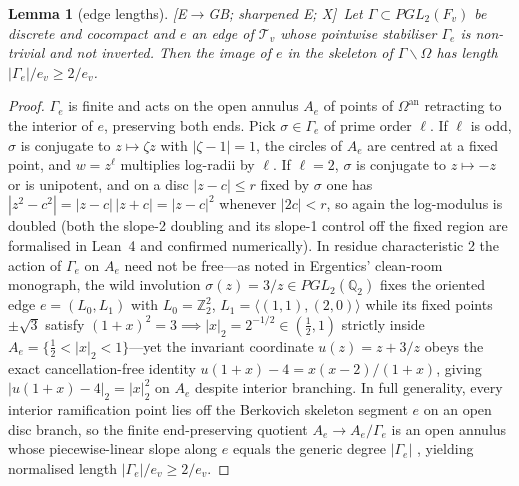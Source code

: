 \documentclass[11pt]{amsart}
\numberwithin{equation}{section}
\theoremstyle{plain}
\newtheorem{lemma}[theorem]{Lemma}
\theoremstyle{definition}\newtheorem{definition}[theorem]{Definition}
\theoremstyle{remark}\newtheorem{remark}[theorem]{Remark}
\newcommand{\Z}{\mathbb{Z}}\newcommand{\Q}{\mathbb{Q}}\newcommand{\C}{\mathbb{C}}\newcommand{\F}{\mathbb{F}}\newcommand{\R}{\mathbb{R}}
\newcommand{\ctag}[1]{\textup{\textsf{\scriptsize[#1]}}}
\begin{document}
\begin{lemma}[edge lengths]\label{lem:length}
\ctag{E$\to$GB; sharpened E; X}\ Let $\Gamma\subset PGL_2(F_v)$ be discrete and cocompact and $e$ an edge of $\mathcal T_v$ whose pointwise stabiliser $\Gamma_e$ is non-trivial and not inverted. Then the image of $e$ in the skeleton of $\Gamma\backslash\Omega$ has length $|\Gamma_e|/e_v\ge2/e_v$.
\end{lemma}
\begin{proof}
$\Gamma_e$ is finite and acts on the open annulus $A_e$ of points of $\Omega^{\mathrm{an}}$ retracting to the interior of $e$, preserving both ends. Pick $\sigma\in\Gamma_e$ of prime order $\ell$. If $\ell$ is odd, $\sigma$ is conjugate to $z\mapsto\zeta z$ with $|\zeta-1|=1$, the circles of $A_e$ are centred at a fixed point, and $w=z^\ell$ multiplies log-radii by $\ell$. If $\ell=2$, $\sigma$ is conjugate to $z\mapsto-z$ or is unipotent, and on a disc $|z-c|\le r$ fixed by $\sigma$ one has $|z^2-c^2|=|z-c|\,|z+c|=|z-c|^2$ whenever $|2c|<r$, so again the log-modulus is doubled (both the slope-2 doubling and its slope-1 control off the fixed region are formalised in Lean~4 and confirmed numerically). In residue characteristic 2 the action of $\Gamma_e$ on $A_e$ need not be free---as noted in Ergentics' clean-room monograph, the wild involution $\sigma(z)=3/z\in PGL_2(\Q_2)$ fixes the oriented edge $e=(L_0,L_1)$ with $L_0=\Z_2^2$, $L_1=\langle(1,1),(2,0)\rangle$ while its fixed points $\pm\sqrt3$ satisfy $(1+x)^2=3\implies|x|_2=2^{-1/2}\in(\tfrac12,1)$ strictly inside $A_e=\{\tfrac12<|x|_2<1\}$---yet the invariant coordinate $u(z)=z+3/z$ obeys the exact cancellation-free identity $u(1+x)-4=x(x-2)/(1+x)$, giving $|u(1+x)-4|_2=|x|_2^2$ on $A_e$ despite interior branching. In full generality, every interior ramification point lies off the Berkovich skeleton segment $e$ on an open disc branch, so the finite end-preserving quotient $A_e\to A_e/\Gamma_e$ is an open annulus whose piecewise-linear slope along $e$ equals the generic degree $|\Gamma_e|$ \cite{bpr13}, yielding normalised length $|\Gamma_e|/e_v\ge2/e_v$.
\end{proof}
\end{document}
